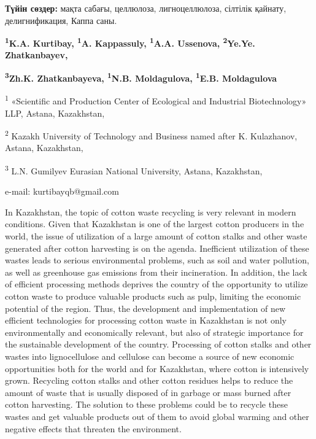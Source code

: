 {\bfseries Түйін сөздер:} мақта сабағы, целлюлоза, лигноцеллюлоза, сілтілік
қайнату, делигнификация, Каппа саны.


\begin{center}
{\bfseries \textsuperscript{1}K.A. Kurtibay\envelope, \textsuperscript{1}A.
Kappassuly, \textsuperscript{1}A.A. Ussenova, \textsuperscript{2}Ye.Ye.
Zhatkanbayev,}

{\bfseries \textsuperscript{3}Zh.K. Zhatkanbayeva, \textsuperscript{1}N.B.
Moldagulova, \textsuperscript{1}E.B. Moldagulova}

\textsuperscript{1} «Scientific and Production Center of Ecological and
Industrial Biotechnology» LLP, Astana, Kazakhstan,

\textsuperscript{2} Kazakh University of Technology and Business named
after K. Kulazhanov, Astana, Kazakhstan,

\textsuperscript{3} L.N. Gumilyev Eurasian National University, Astana,
Kazakhstan,

e-mail: kurtibayqb@gmail.com
\end{center}

In Kazakhstan, the topic of cotton waste recycling is very relevant in
modern conditions. Given that Kazakhstan is one of the largest cotton
producers in the world, the issue of utilization of a large amount of
cotton stalks and other waste generated after cotton harvesting is on
the agenda. Inefficient utilization of these wastes leads to serious
environmental problems, such as soil and water pollution, as well as
greenhouse gas emissions from their incineration. In addition, the lack
of efficient processing methods deprives the country of the opportunity
to utilize cotton waste to produce valuable products such as pulp,
limiting the economic potential of the region. Thus, the development and
implementation of new efficient technologies for processing cotton waste
in Kazakhstan is not only environmentally and economically relevant, but
also of strategic importance for the sustainable development of the
country. Processing of cotton stalks and other wastes into
lignocellulose and cellulose can become a source of new economic
opportunities both for the world and for Kazakhstan, where cotton is
intensively grown. Recycling cotton stalks and other cotton residues
helps to reduce the amount of waste that is usually disposed of in
garbage or mass burned after cotton harvesting. The solution to these
problems could be to recycle these wastes and get valuable products out
of them to avoid global warming and other negative effects that threaten
the environment.

